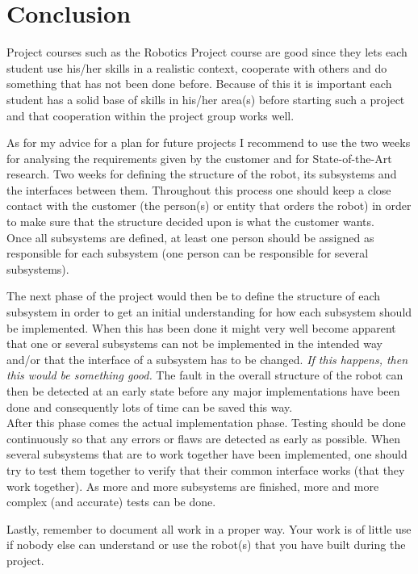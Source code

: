 \section{Conclusion}\label{sec:conclusion}
Project courses such as the Robotics Project course are good since they lets each student use his/her skills in a realistic context, cooperate with others and do something that has not been done before. Because of this it is important each student has a solid base of skills in his/her area(s) before starting such a project and that cooperation within the project group works well.

As for my advice for a plan for future projects I recommend to use the two weeks for analysing the requirements given by the customer and for State-of-the-Art research. Two weeks for defining the structure of the robot, its subsystems and the interfaces between them. Throughout this process one should keep a close contact with the customer (the person(s) or entity that orders the robot) in order to make sure that the structure decided upon is what the customer wants. \\
Once all subsystems are defined, at least one person should be assigned as responsible for each subsystem (one person can be responsible for several subsystems).

The next phase of the project would then be to define the structure of each subsystem in order to get an initial understanding for how each subsystem should be implemented. When this has been done it might very well become apparent that one or several subsystems can not be implemented in the intended way and/or that the interface of a subsystem has to be changed.\emph{ If this happens, then this would be something good.} The fault in the overall structure of the robot can then be detected at an early state before any major implementations have been done and consequently lots of time can be saved this way. \\
After this phase comes the actual implementation phase. Testing should be done continuously so that any errors or flaws are detected as early as possible. When several subsystems that are to work together have been implemented, one should try to test them together to verify that their common interface works (that they work together). As more and more subsystems are finished, more and more complex (and accurate) tests can be done.

Lastly, remember to document all work in a proper way. Your work is of little use if nobody else can understand or use the robot(s) that you have built during the project.